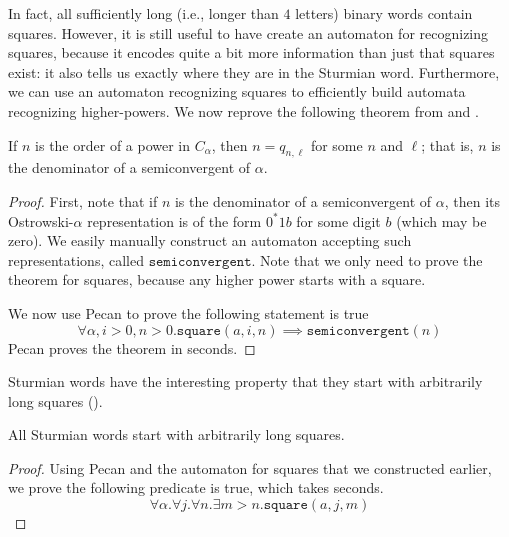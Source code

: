 In fact, all sufficiently long (i.e., longer than $4$ letters) binary words contain squares.
However, it is still useful to have create an automaton for recognizing squares, because it encodes quite a bit more information than just that squares exist: it also tells us exactly where they are in the Sturmian word.
Furthermore, we can use an automaton recognizing squares to efficiently build automata recognizing higher-powers.
We now reprove the following theorem from \autocite[Proposition 4.1]{PELTOMAKI2015886} and \autocite[Theorem 1]{DAMANIK2003377}.
\begin{theorem}
    If $n$ is the order of a power in $C_{\alpha}$, then $n = q_{n,\ell}$ for some $n$ and $\ell$; that is, $n$ is the denominator of a semiconvergent of $\alpha$.
\end{theorem}
\begin{proof}
    First, note that if $n$ is the denominator of a semiconvergent of $\alpha$, then its Ostrowski-$\alpha$ representation is of the form $0^*1b$ for some digit $b$ (which may be zero).
    We easily manually construct an automaton accepting such representations, called $\texttt{semiconvergent}$.
    Note that we only need to prove the theorem for squares, because any higher power starts with a square.
    
    We now use Pecan to prove the following statement is true
    \[
        \forall \alpha, i > 0, n > 0. \texttt{square}(a,i,n) \implies \texttt{semiconvergent}(n)
    \]
    Pecan proves the theorem in  seconds.
\end{proof} 

Sturmian words have the interesting property that they start with arbitrarily long squares (\autocite[Theorem 1]{Dubickas2009}).

\begin{theorem}
    All Sturmian words start with arbitrarily long squares.
\end{theorem}
\begin{proof}
Using Pecan and the automaton for squares that we constructed earlier, we prove the following predicate is true, which takes  seconds.
\[
    \forall \alpha. \forall j. \forall n. \exists m > n. \texttt{square}(a, j, m)
\]
\end{proof}

